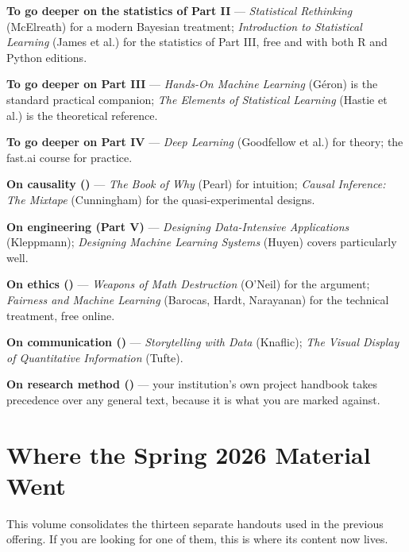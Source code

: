 \begin{tight}
  \item \textbf{To go deeper on the statistics of Part II} --- \emph{Statistical
        Rethinking} (McElreath) for a modern Bayesian treatment;
        \emph{Introduction to Statistical Learning} (James et al.) for the
        statistics of Part III, free and with both R and Python editions.
  \item \textbf{To go deeper on Part III} --- \emph{Hands-On Machine Learning}
        (Géron) is the standard practical companion; \emph{The Elements of
        Statistical Learning} (Hastie et al.) is the theoretical reference.
  \item \textbf{To go deeper on Part IV} --- \emph{Deep Learning} (Goodfellow et
        al.) for theory; the fast.ai course for practice.
  \item \textbf{On causality ()} --- \emph{The Book of Why}
        (Pearl) for intuition; \emph{Causal Inference: The Mixtape} (Cunningham)
        for the quasi-experimental designs.
  \item \textbf{On engineering (Part V)} --- \emph{Designing Data-Intensive
        Applications} (Kleppmann); \emph{Designing Machine Learning Systems}
        (Huyen) covers  particularly well.
  \item \textbf{On ethics ()} --- \emph{Weapons of Math Destruction}
        (O'Neil) for the argument; \emph{Fairness and Machine Learning}
        (Barocas, Hardt, Narayanan) for the technical treatment, free online.
  \item \textbf{On communication ()} --- \emph{Storytelling
        with Data} (Knaflic); \emph{The Visual Display of Quantitative
        Information} (Tufte).
  \item \textbf{On research method ()} --- your institution's own
        project handbook takes precedence over any general text, because it is what
        you are marked against.
\end{tight}

\section{Where the Spring 2026 Material Went}

This volume consolidates the thirteen separate handouts used in the previous
offering. If you are looking for one of them, this is where its content now lives.


